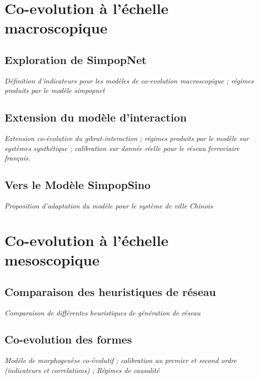 \section{Co-evolution à l'échelle macroscopique}

\subsection{Exploration de SimpopNet}

\textit{Définition d'indicateurs pour les modèles de co-evolution macroscopique ; régimes produits par le modèle simpopnet}

\subsection{Extension du modèle d'interaction}


\textit{Extension co-évolutive du gibrat-interaction ; régimes produits par le modèle sur systèmes synthétique ; calibration sur donnée réelle pour le réseau ferroviaire français.}


\subsection{Vers le Modèle SimpopSino}

\textit{Proposition d'adaptation du modèle pour le système de ville Chinois}





\section{Co-evolution à l'échelle mesoscopique}


\subsection{Comparaison des heuristiques de réseau}

\textit{Comparaison de différentes heuristiques de génération de réseau}


\subsection{Co-evolution des formes}

\textit{Modèle de morphogenèse co-évolutif ; calibration au premier et second ordre (indicateurs et correlations) ; Régimes de causalité}



